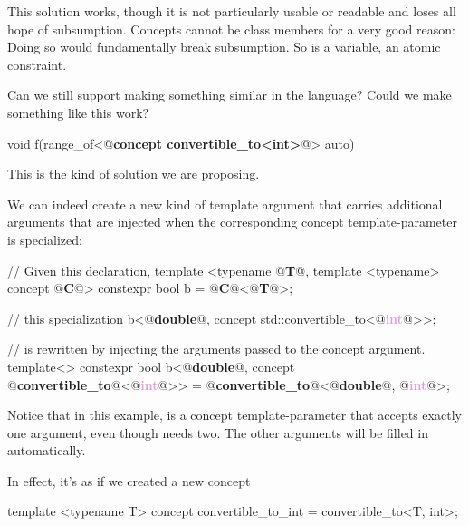 \documentclass{wg21}
\begin{document}
This solution works, though it is not particularly usable or readable and loses all hope of subsumption.
Concepts cannot be class members for a very good reason: Doing so would fundamentally break subsumption. So  is a  variable, an atomic constraint.

Can we still support making something similar in the language? Could we make something like this work?

\begin{colorblock}
void f(range_of<@\textbf{concept convertible_to<int>}@> auto)
\end{colorblock}

This is the kind of solution we are proposing.


We can indeed create a new kind of template argument that carries additional arguments that are injected when the corresponding concept template-parameter is specialized:
\begin{colorblock}
// Given this declaration,
template <typename @\textbf{\textcolor{OliveGreen}{T}}@, template <typename> concept @\textbf{\textcolor{WildStrawberry}{C}}@>
constexpr bool b = @\textbf{\textcolor{WildStrawberry}{C}}@<@\textbf{\textcolor{OliveGreen}{T}}@>;

// this specialization
b<@\textbf{\textcolor{OliveGreen}{double}}@, concept std::convertible_to<@\textbf{\textcolor{Plum}{int}}@>>;

// is rewritten by injecting the arguments passed to the concept argument.
template<>
constexpr bool b<@\textbf{\textcolor{OliveGreen}{double}}@, concept @\textbf{\textcolor{WildStrawberry}{convertible_to}}@<@\textbf{\textcolor{Plum}{int}}@>> = @\textbf{\textcolor{WildStrawberry}{convertible_to}}@<@\textbf{\textcolor{OliveGreen}{double}}@, @\textbf{\textcolor{Plum}{int}}@>;
\end{colorblock}

Notice that in this example,  is a concept template-parameter that accepts exactly one argument,
even though  needs two.
The other arguments will be filled in automatically.

In effect, it's as if we created a new concept

\begin{colorblock}
template <typename T>
concept convertible_to_int = convertible_to<T, int>;
\end{colorblock}
\end{document}
